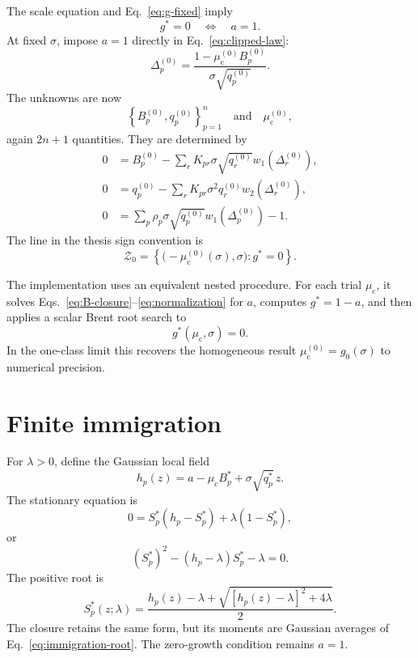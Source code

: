 \documentclass[11pt]{article}
\newcommand{\mc}{\mu_{\mathrm c}}
\begin{document}
The scale equation and Eq.~\eqref{eq:g-fixed} imply
\begin{equation}
  g^*=0
  \quad\Longleftrightarrow\quad
  a=1.
  \label{eq:zero-condition}
\end{equation}
At fixed $\sigma$, impose $a=1$ directly in Eq.~\eqref{eq:clipped-law}:
\begin{equation}
  \Delta_p^{(0)}
  =\frac{1-\mc^{(0)}B_p^{(0)}}
  {\sigma\sqrt{q_p^{(0)}}}.
  \label{eq:delta-zero}
\end{equation}
The unknowns are now
\begin{equation}
  \left\{B_p^{(0)},q_p^{(0)}\right\}_{p=1}^n
  \quad\text{and}\quad \mc^{(0)},
\end{equation}
again $2n+1$ quantities.  They are determined by
\begin{align}
  0&=B_p^{(0)}-\sum_rK_{pr}
  \sigma\sqrt{q_r^{(0)}}w_1(\Delta_r^{(0)}),
  \label{eq:zero-B}\\
  0&=q_p^{(0)}-\sum_rK_{pr}
  \sigma^2q_r^{(0)}w_2(\Delta_r^{(0)}),
  \label{eq:zero-q}\\
  0&=\sum_p\rho_p\sigma\sqrt{q_p^{(0)}}
  w_1(\Delta_p^{(0)})-1.
  \label{eq:zero-normalization}
\end{align}
The line in the thesis sign convention is
\begin{equation}
  \mathcal Z_0
  =\left\{\bigl(-\mc^{(0)}(\sigma),\sigma\bigr):g^*=0\right\}.
  \label{eq:zero-line}
\end{equation}

The implementation uses an equivalent nested procedure.  For each trial
$\mc$, it solves Eqs.~\eqref{eq:B-closure}--\eqref{eq:normalization} for $a$,
computes $g^*=1-a$, and then applies a scalar Brent root search to
\begin{equation}
  g^*(\mc,\sigma)=0.
\end{equation}
In the one-class limit this recovers the homogeneous result
$\mc^{(0)}=g_0(\sigma)$ to numerical precision.

\section{Finite immigration}

For $\lambda>0$, define the Gaussian local field
\begin{equation}
  h_p(z)=a-\mc B_p^*+\sigma\sqrt{q_p^*}\,z.
\end{equation}
The stationary equation is
\begin{equation}
  0=S_p^*(h_p-S_p^*)+\lambda(1-S_p^*),
\end{equation}
or
\begin{equation}
  (S_p^*)^2-(h_p-\lambda)S_p^*-\lambda=0.
\end{equation}
The positive root is
\begin{equation}
  S_p^*(z;\lambda)
  =\frac{h_p(z)-\lambda+
  \sqrt{[h_p(z)-\lambda]^2+4\lambda}}{2}.
  \label{eq:immigration-root}
\end{equation}
The closure retains the same form, but its moments are Gaussian averages of
Eq.~\eqref{eq:immigration-root}.  The zero-growth condition remains $a=1$.
\end{document}
